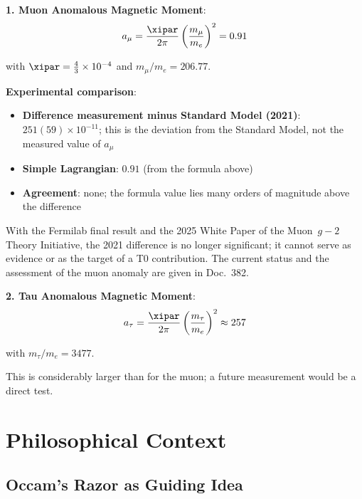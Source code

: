 	\textbf{1. Muon Anomalous Magnetic Moment}:
	\begin{equation}
		a_{\mu} = \frac{\xipar}{2\pi} \left(\frac{m_{\mu}}{m_e}\right)^2 = 0.91
	\end{equation}
	
	with $\xipar = \tfrac{4}{3}\times10^{-4}$ and $m_\mu/m_e = 206.77$.
	
	\textbf{Experimental comparison}:
	\begin{itemize}
		\item \textbf{Difference measurement minus Standard Model (2021)}: $251(59) \times 10^{-11}$; this is the deviation from the Standard Model, not the measured value of $a_\mu$
		\item \textbf{Simple Lagrangian}: $0.91$ (from the formula above)
		\item \textbf{Agreement}: none; the formula value lies many orders of magnitude above the difference
	\end{itemize}
	
	With the Fermilab final result and the 2025 White Paper of the Muon~$g-2$ Theory Initiative, the 2021 difference is no longer significant; it cannot serve as evidence or as the target of a T0 contribution. The current status and the assessment of the muon anomaly are given in Doc.~382.
	
	\textbf{2. Tau Anomalous Magnetic Moment}:
	\begin{equation}
		a_{\tau} = \frac{\xipar}{2\pi} \left(\frac{m_{\tau}}{m_e}\right)^2 \approx 257
	\end{equation}
	
	with $m_\tau/m_e = 3477$.
	
	This is considerably larger than for the muon; a future measurement would be a direct test.
	
	\section{Philosophical Context}
	
	\subsection{Occam's Razor as Guiding Idea}
	
